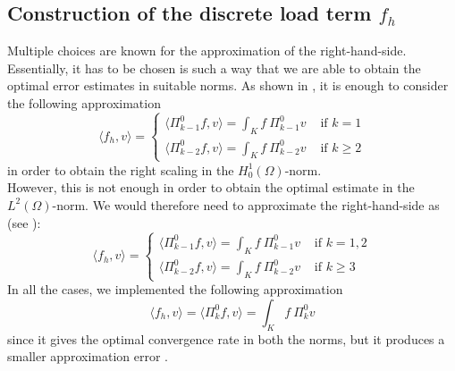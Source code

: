 \documentclass[10pt]{article}
\begin{document}
\subsection{Construction of the discrete load term $f_h$}
Multiple choices are known for the approximation of the right-hand-side. Essentially, it has to be chosen is such a way that we are able to obtain the optimal error estimates in suitable norms. As shown in \cite{Basic_principles}, \cite{Equivalent_proj} it is enough to consider the following approximation
\begin{equation}
\langle f_h,v \rangle= 
\begin{cases}
\langle \Pi_{k-1}^0 f, v \rangle = \int_K f \ \Pi_{k-1}^0 v &\mbox{ if $k=1$} \\
\langle \Pi_{k-2}^0 f, v \rangle = \int_K f \ \Pi_{k-2}^0 v &\mbox{ if $k\geq 2$}
\end{cases}
\label{eqn:RHS}
\end{equation}
in order to obtain the right scaling in the $H^1_0(\Omega)$-norm. \\
However, this is not enough in order to obtain the optimal estimate in the $L^2(\Omega)$-norm. We would therefore need to approximate the right-hand-side as (see \cite{Equivalent_proj}):
\begin{equation}
\langle f_h,v \rangle= 
\begin{cases}
\langle \Pi_{k-1}^0 f, v \rangle = \int_K f \ \Pi_{k-1}^0 v &\mbox{ if $k=1,2$} \\
\langle \Pi_{k-2}^0 f, v \rangle = \int_K f \ \Pi_{k-2}^0 v &\mbox{ if $k\geq 3$}
\end{cases}
\label{eqn:RHSL2}
\end{equation}
In all the cases, we implemented the following approximation
\begin{equation}
	\langle f_h,v \rangle= \langle \Pi_{k}^0 f, v \rangle = \int_K f \ \Pi_{k}^0 v
	\label{eqn:RHS_impl}
\end{equation}
since it gives the optimal convergence rate in both the norms, but it produces a smaller approximation error \cite{hitchhiker}.
\end{document}

